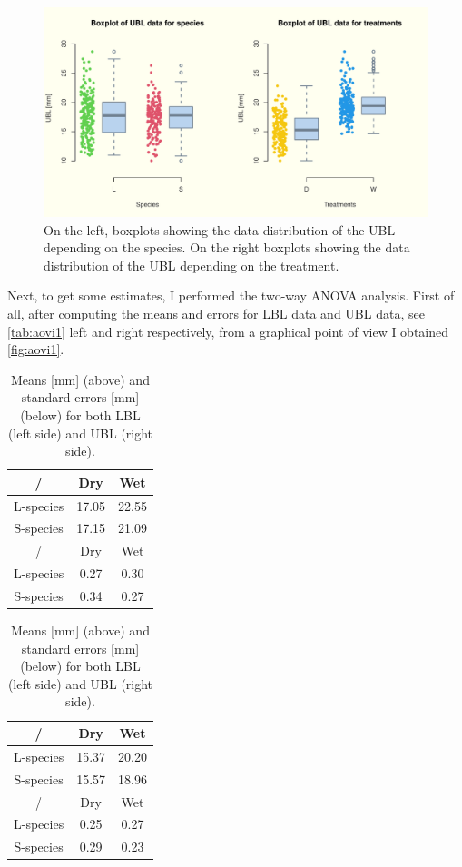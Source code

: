 \documentclass{article}
\begin{document}
\begin{figure}[H]
\centering
  \includegraphics[scale=0.5]{boxplots_ubl.pdf}
\caption{On the left, boxplots showing the data distribution of the UBL depending on the species. On the right boxplots showing the data distribution of the UBL depending on the treatment.}
  \label{fig:boxi2}
\end{figure}
\fi
Next, to get some estimates, I performed the two-way ANOVA analysis. 
First of all, after computing the means and errors for LBL data and UBL data, see \autoref{tab:aovi1} left and right respectively, from a graphical point of view I obtained \autoref{fig:aovi1}.
\begin{table}[!htb]
    \caption{Means [mm] (above) and standard errors [mm] (below) for both LBL (left side) and UBL (right side).}
    \label{tab:aovi1}
    \begin{minipage}{.5\linewidth}
      \centering
\begin{tabular}{c c c} 
 \hline
/ & Dry & Wet   \\  
 \hline
 L-species &17.05&22.55 \\
 S-species &17.15&21.09  \\
 \hline
 \hline
/ & Dry & Wet   \\  
 \hline
 L-species &0.27&0.30 \\
 S-species &0.34&0.27  \\
 \hline
\end{tabular}
    \end{minipage}%
    \begin{minipage}{.5\linewidth}
      \centering
\begin{tabular}{c c c} 
 \hline
/ & Dry & Wet   \\  
 \hline
 L-species &15.37&20.20 \\
 S-species &15.57&18.96  \\
 \hline
 \hline
/ & Dry & Wet   \\  
 \hline
 L-species &0.25&0.27 \\
 S-species &0.29&0.23  \\
 \hline
\end{tabular}
    \end{minipage} 
\end{table}
\end{document}
